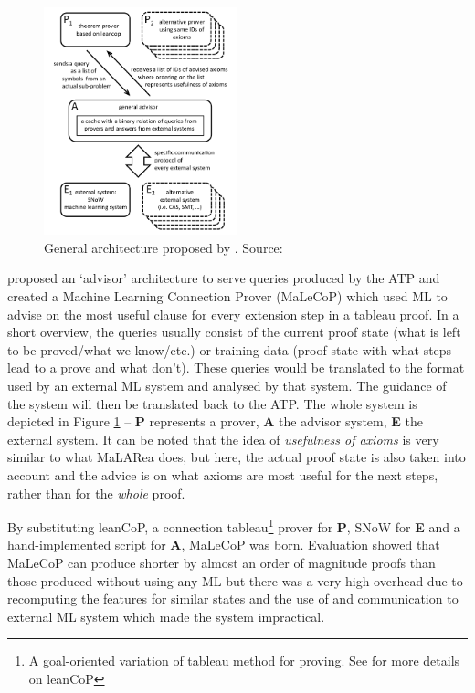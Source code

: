 \documentclass{article}
\begin{document}
\begin{figure}[t]
    \centering
    \includegraphics[width=0.5\textwidth]{malecop_arch.png}
    \caption{General architecture proposed by \cite{malecop}. Source: \cite{malecop}}
    \label{fig:malecop}
\end{figure}

\cite{malecop} proposed an `advisor' architecture to serve queries produced by
the ATP and created a Machine Learning Connection Prover (MaLeCoP) which used
ML to advise on the most useful clause for every extension step in a tableau
proof. In a short overview, the queries usually consist of the current proof
state (what is left to be proved/what we know/etc.) or training data (proof
state with what steps lead to a prove and what don't). These queries would be
translated to the format used by an external ML system and analysed by that
system. The guidance of the system will then be translated back to the ATP.
The whole system is depicted in Figure \ref{fig:malecop} -- \textbf{P}
represents a prover, \textbf{A} the advisor system, \textbf{E} the external
system. It can be noted that the idea of \emph{usefulness of axioms} is very
similar to what MaLARea does, but here, the actual proof state is also taken
into account and the advice is on what axioms are most useful for the next
steps, rather than for the \emph{whole} proof.

By substituting leanCoP, a connection tableau\footnote{A goal-oriented
variation of tableau method for proving. See \cite{leancop} for more details on
leanCoP} prover for \textbf{P}, SNoW \citep{SNoW} for \textbf{E} and
a hand-implemented script for \textbf{A}, MaLeCoP was born. Evaluation showed
that MaLeCoP can produce shorter by almost an order of magnitude proofs than
those produced without using any ML but there was a very high overhead due
to recomputing the features for similar states and the use of and communication
to external ML system which made the system impractical.
\end{document}
